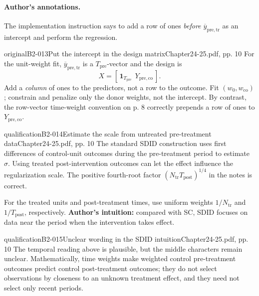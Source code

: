 \paragraph{Author's annotations.}
 
The implementation instruction says to add a row of ones \emph{before \(\overline y_{\mathrm{pre,tr}}\)} as an intercept and perform the regression.
\begin{reviewnote}{original}{B2-013}{Put the intercept in the design matrix}{Chapter24-25.pdf, pp. 10}
For the unit-weight fit, \(\overline y_{\mathrm{pre,tr}}\) is a \(T_{\mathrm{pre}}\)-vector and the design is
\[
X=[\,\mathbf1_{T_{\mathrm{pre}}}\ \ Y_{\mathrm{pre,co}}\,].
\]
Add a \emph{column} of ones to the predictors, not a row to the outcome. Fit \((w_0,w_{\mathrm{co}})\); constrain and penalize only the donor weights, not the intercept. By contrast, the row-vector time-weight convention on p. 8 correctly prepends a row of ones to \(Y_{\mathrm{pre,co}}\).
\par{}
\end{reviewnote}
\begin{reviewnote}{qualification}{B2-014}{Estimate the scale from untreated pre-treatment data}{Chapter24-25.pdf, pp. 10}
The standard SDID construction uses first differences of control-unit outcomes during the pre-treatment period to estimate \(\widehat\sigma\). Using treated post-intervention outcomes can let the effect influence the regularization scale. The positive fourth-root factor \((N_{\mathrm{tr}}T_{\mathrm{post}})^{1/4}\) in the notes is correct.
\par{}
\end{reviewnote}


For the treated units and post-treatment times, use uniform weights \(1/N_{\mathrm{tr}}\) and \(1/T_{\mathrm{post}}\), respectively. \textbf{Author's intuition:} compared with SC, SDID focuses on data near the period when the intervention takes effect.\begin{reviewnote}{qualification}{B2-015}{Unclear wording in the SDID intuition}{Chapter24-25.pdf, pp. 10}
The temporal reading above is plausible, but the middle characters remain unclear. Mathematically, time weights make weighted control pre-treatment outcomes predict control post-treatment outcomes; they do not select observations by closeness to an unknown treatment effect, and they need not select only recent periods.
\par{}
\end{reviewnote}


